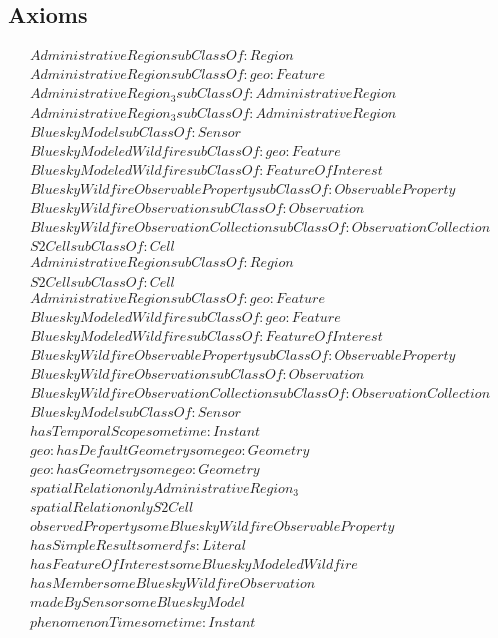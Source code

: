 \subsection{Axioms}
\begin{align}
  AdministrativeRegion subClassOf: Region\\
  AdministrativeRegion subClassOf: geo:Feature\\
  AdministrativeRegion_3 subClassOf: AdministrativeRegion\\
  AdministrativeRegion_3 subClassOf: AdministrativeRegion\\
  BlueskyModel subClassOf: Sensor\\
  BlueskyModeledWildfire subClassOf: geo:Feature\\
  BlueskyModeledWildfire subClassOf: FeatureOfInterest\\
  BlueskyWildfireObservableProperty subClassOf: ObservableProperty\\
  BlueskyWildfireObservation subClassOf: Observation\\
  BlueskyWildfireObservationCollection subClassOf: ObservationCollection\\
  S2Cell subClassOf: Cell\\
  AdministrativeRegion subClassOf: Region\\
  S2Cell subClassOf: Cell\\
  AdministrativeRegion subClassOf: geo:Feature\\
  BlueskyModeledWildfire subClassOf: geo:Feature\\
  BlueskyModeledWildfire subClassOf: FeatureOfInterest\\
  BlueskyWildfireObservableProperty subClassOf: ObservableProperty\\
  BlueskyWildfireObservation subClassOf: Observation\\
  BlueskyWildfireObservationCollection subClassOf: ObservationCollection\\
  BlueskyModel subClassOf: Sensor\\
  hasTemporalScope some time:Instant \\
  geo:hasDefaultGeometry some geo:Geometry \\
  geo:hasGeometry some geo:Geometry \\
  spatialRelation only AdministrativeRegion_3 \\
  spatialRelation only S2Cell \\
  observedProperty some BlueskyWildfireObservableProperty \\
  hasSimpleResult some rdfs:Literal \\
  hasFeatureOfInterest some BlueskyModeledWildfire \\
  hasMember some BlueskyWildfireObservation \\
  madeBySensor some BlueskyModel \\
  phenomenonTime some time:Instant \end{align}


